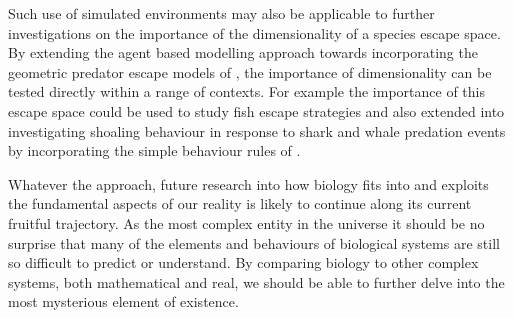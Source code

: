Such use of simulated environments may also be applicable to further investigations on the importance of the dimensionality of a species escape space. By extending the agent based modelling approach towards incorporating the geometric predator escape models of \cite{howland1974optimal}, the importance of dimensionality can be tested directly within a range of contexts. For example the importance of this escape space could be used to study fish escape strategies \citep{domenici1997kinematics} and also extended into investigating shoaling behaviour in response to shark and whale predation events by incorporating the simple behaviour rules of \cite{couzin2002collective}.


Whatever the approach, future research into how biology fits into and exploits the fundamental aspects of our reality is likely to continue along its current fruitful trajectory. As the most complex entity in the universe it should be no surprise that many of the elements and behaviours of biological systems are still so difficult to predict or understand. By comparing biology to other complex systems, both mathematical and real, we should be able to further delve into the most mysterious element of existence.


%
%





